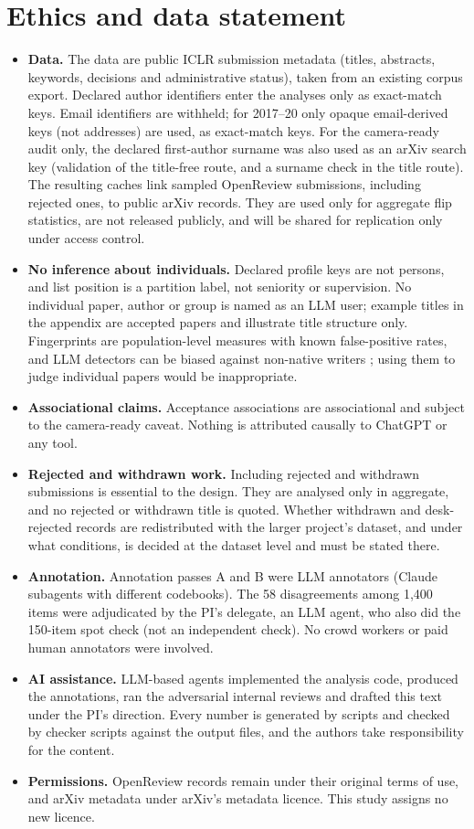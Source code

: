 \section{Ethics and data statement}
\label{sec:nt-ethics}

\begin{itemize}
\item \textbf{Data.} The data are public ICLR submission metadata (titles, abstracts, keywords, decisions and administrative status), taken from an existing corpus export. Declared author identifiers enter the analyses only as exact-match keys. Email identifiers are withheld; for 2017--20 only opaque email-derived keys (not addresses) are used, as exact-match keys. For the camera-ready audit only, the declared first-author surname was also used as an arXiv search key (validation of the title-free route, and a surname check in the title route). The resulting caches link sampled OpenReview submissions, including rejected ones, to public arXiv records. They are used only for aggregate flip statistics, are not released publicly, and will be shared for replication only under access control.
\item \textbf{No inference about individuals.} Declared profile keys are not persons, and list position is a partition label, not seniority or supervision. No individual paper, author or group is named as an LLM user; example titles in the appendix are accepted papers and illustrate title structure only. Fingerprints are population-level measures with known false-positive rates, and LLM detectors can be biased against non-native writers \citep{liang2023detectors}; using them to judge individual papers would be inappropriate.
\item \textbf{Associational claims.} Acceptance associations are associational and subject to the camera-ready caveat. Nothing is attributed causally to ChatGPT or any tool.
\item \textbf{Rejected and withdrawn work.} Including rejected and withdrawn submissions is essential to the design. They are analysed only in aggregate, and no rejected or withdrawn title is quoted. Whether withdrawn and desk-rejected records are redistributed with the larger project's dataset, and under what conditions, is decided at the dataset level and must be stated there.
\item \textbf{Annotation.} Annotation passes A and B were LLM annotators (Claude subagents with different codebooks). The 58 disagreements among 1,400 items were adjudicated by the PI's delegate, an LLM agent, who also did the 150-item spot check (not an independent check). No crowd workers or paid human annotators were involved.
\item \textbf{AI assistance.} LLM-based agents implemented the analysis code, produced the annotations, ran the adversarial internal reviews and drafted this text under the PI's direction. Every number is generated by scripts and checked by checker scripts against the output files, and the authors take responsibility for the content.
\item \textbf{Permissions.} OpenReview records remain under their original terms of use, and arXiv metadata under arXiv's metadata licence. This study assigns no new licence.
\end{itemize}
